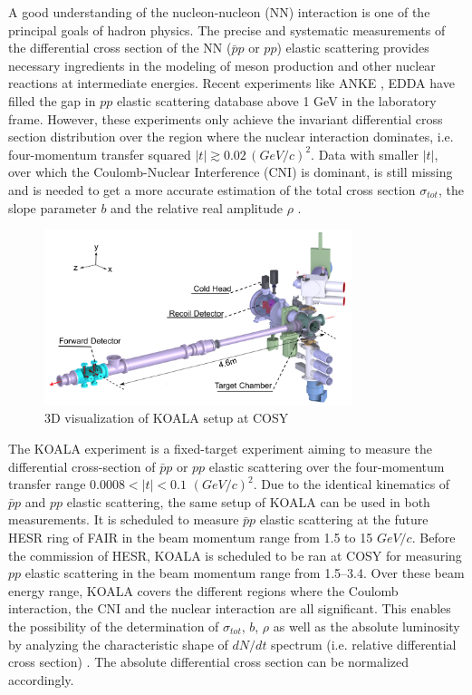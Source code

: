 \documentclass[number,5p]{elsarticle}
\begin{document}
A good understanding of the nucleon-nucleon (NN) interaction is one of the principal goals of hadron physics.
The precise and systematic measurements of the differential cross section of the
NN ($\bar{p}p$ or $pp$) elastic scattering provides necessary ingredients
in the modeling of meson production and other nuclear reactions at intermediate energies.
Recent experiments like ANKE \cite{ANKE}, EDDA \cite{EDDA} have filled the gap
in $pp$ elastic scattering database above 1 GeV in the laboratory frame.
However, these experiments only achieve the invariant differential cross section distribution over the region where the nuclear interaction dominates, 
i.e. four-momentum transfer squared \(|t| \gtrsim 0.02\,(GeV/c)^2\).
Data with smaller \(|t|\), over which the Coulomb-Nuclear Interference (CNI) is
dominant, is still missing and is needed to get a more accurate estimation of
the total cross section \({\sigma}_{tot}\), the slope parameter \(b\) and the
relative real amplitude \(\rho\) \cite{RevModPhys.57.563}.

\begin{figure}[htbp]
	\centering
	\includegraphics[width=0.8\textwidth]{./koala_setup.png}
	\caption{3D visualization of KOALA setup at COSY}
	\label{fig:setup}
\end{figure}

The KOALA experiment is a fixed-target experiment aiming to measure the
differential cross-section of $\bar{p}p$ or $pp$ elastic scattering
over the four-momentum transfer range \(0.0008 < |t| < 0.1\) \((GeV/c)^2\).
Due to the identical kinematics of $\bar{p}p$ and $pp$ elastic scattering, the
same setup of KOALA can be used in both measurements.
It is scheduled to measure $\bar{p}p$ elastic
scattering at the future HESR ring of FAIR \cite{FAIR} in the beam momentum range from
1.5 to 15 $GeV/c$.
Before the commission of HESR, KOALA is scheduled to be ran at COSY \cite{COSY}
for measuring $pp$ elastic scattering in the beam momentum range from \SIrange{1.5}{3.4}{\momentum}.
Over these beam energy range, KOALA covers the different regions where the Coulomb interaction, the CNI and the nuclear interaction are all significant.
This enables the possibility of the determination of \({\sigma}_{tot}\), \(b\), \(\rho\) as well as
the absolute luminosity by analyzing the characteristic shape of $dN/dt$
spectrum (i.e. relative differential cross section) \cite{bernard1987real,
  jenni2008atlas, recoil_article}.
The absolute differential cross section can be normalized accordingly.
\end{document}

